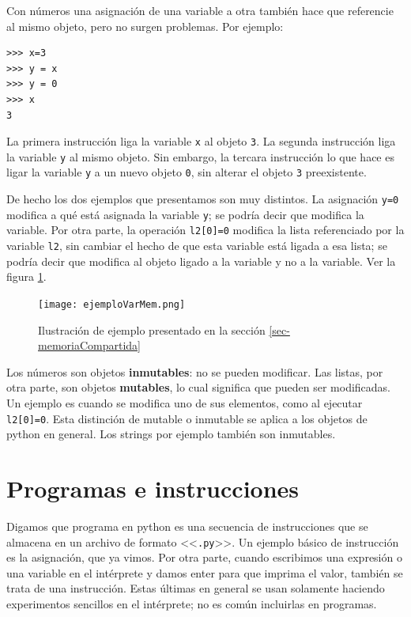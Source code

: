 \documentclass[a4paper, 12pt]{report}
\theoremstyle{definition}
\begin{document}
Con números una asignación de una variable a otra también hace que referencie al mismo objeto, pero no surgen problemas. Por ejemplo:
\begin{verbatim}
>>> x=3
>>> y = x
>>> y = 0
>>> x
3
\end{verbatim}
La primera instrucción liga la variable {\tt x} al objeto {\tt 3}. La segunda instrucción liga la variable {\tt y} al mismo objeto. Sin embargo, la tercara instrucción lo que hace es ligar la variable {\tt y} a un nuevo objeto {\tt 0}, sin alterar el objeto {\tt 3} preexistente.

De hecho los dos ejemplos que presentamos son muy distintos. La asignación {\tt y=0} modifica a qué está asignada la variable {\tt y}; se podría decir que modifica la variable. Por otra parte, la operación {\tt l2[0]=0} modifica la lista referenciado por la variable {\tt l2}, sin cambiar el hecho de que esta variable está ligada a esa lista; se podría decir que modifica al objeto ligado a la variable y no a la variable. Ver la figura \ref{fig-ejemploVarMem}.

\begin{figure}
	\centering
	\texttt{[image: ejemploVarMem.png]}
	\caption{Ilustración de ejemplo presentado en la sección \ref{sec-memoriaCompartida}}
	\label{fig-ejemploVarMem}
\end{figure}

Los números son objetos {\bf inmutables}: no se pueden modificar. Las listas, por otra parte, son objetos {\bf mutables}, lo cual significa que pueden ser modificadas. Un ejemplo es cuando se modifica uno de sus elementos, como al ejecutar {\tt l2[0]=0}. Esta distinción de mutable o inmutable se aplica a los objetos de python en general. Los strings por ejemplo también son inmutables.



\section{Programas e instrucciones}

Digamos que programa en python es una secuencia de instrucciones que se almacena en un archivo de formato <<{\tt .py}>>. Un ejemplo básico de instrucción es la asignación, que ya vimos. Por otra parte, cuando escribimos una expresión o una variable en el intérprete y damos enter para que imprima el valor, también se trata de una instrucción. Estas últimas en general se usan solamente haciendo experimentos sencillos en el intérprete; no es común incluirlas en programas.
\end{document}
